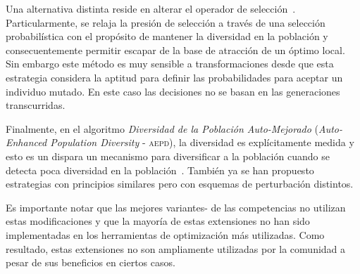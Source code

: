 Una alternativa distinta reside en alterar el operador de selección~\cite{sa2008exploration}.
%
Particularmente, se relaja la presión de selección a través de una selección probabilística con el propósito de mantener la diversidad en la población y consecuentemente permitir escapar de la base de atracción de un óptimo local.
%
Sin embargo este método es muy sensible a transformaciones desde que esta estrategia considera la aptitud para definir las probabilidades para aceptar un individuo mutado.
%
En este caso las decisiones no se basan en las generaciones transcurridas.

Finalmente, en el algoritmo \textit{Diversidad de la Población Auto-Mejorado} (\textit{Auto-Enhanced Population Diversity} - \textsc{aepd}), la diversidad es explícitamente medida y esto es un dispara un mecanismo para diversificar a la población cuando se detecta poca diversidad en la población~\cite{yang2015differential}.
%
También ya se han propuesto estrategias con principios similares pero con esquemas de perturbación distintos.


Es importante notar que las mejores variantes-\DE{} de las competencias no utilizan estas modificaciones y que la mayoría de estas extensiones no han sido implementadas en los herramientas de optimización más utilizadas.
%
Como resultado, estas extensiones no son ampliamente utilizadas por la comunidad a pesar de sus beneficios en ciertos casos.


